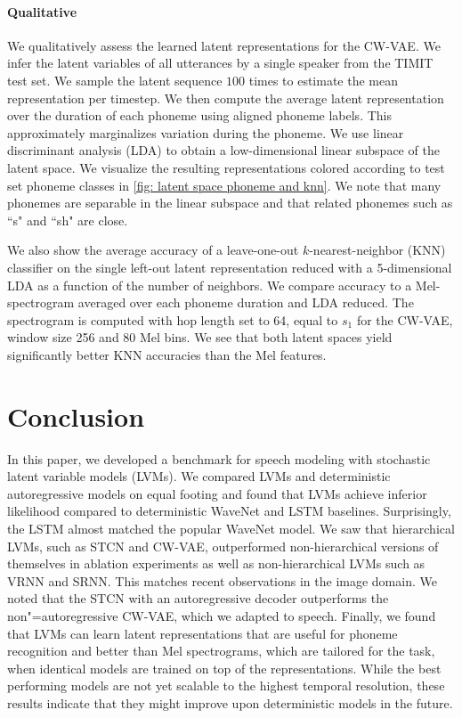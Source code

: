 {\paragraph{Qualitative}
We qualitatively assess the learned latent representations for the CW-VAE. 
We infer the latent variables of all utterances by a single speaker from the TIMIT test set. We sample the latent sequence $100$ times to estimate the mean representation per timestep. We then compute the average latent representation over the duration of each phoneme using aligned phoneme labels. This approximately marginalizes variation during the phoneme. We use linear discriminant analysis (LDA) \parencite{fisher_use_1936} to obtain a low-dimensional linear subspace of the latent space. 
We visualize the resulting representations colored according to test set phoneme classes in \cref{fig: latent space phoneme and knn}. We note that many phonemes are separable in the linear subspace and that related phonemes such as ``s" and ``sh" are close.

We also show the average accuracy of a leave-one-out $k$-nearest-neighbor (KNN) classifier on the single left-out latent representation reduced with a 5-dimensional LDA as a function of the number of neighbors. 
We compare accuracy to a Mel-spectrogram averaged over each phoneme duration and LDA reduced. The spectrogram is computed with hop length set to 64, equal to $s_1$ for the CW-VAE, window size 256 and 80 Mel bins.
We see that both latent spaces yield significantly better KNN accuracies than the Mel features.


\section{Conclusion}
In this paper, we developed a benchmark for speech modeling with stochastic latent variable models (LVMs). 
We compared LVMs and deterministic autoregressive models on equal footing and found that LVMs achieve inferior likelihood compared to deterministic WaveNet and LSTM baselines. Surprisingly, the LSTM almost matched the popular WaveNet model. 
We saw that hierarchical LVMs, such as STCN and CW-VAE, outperformed non-hierarchical versions of themselves in ablation experiments as well as non-hierarchical LVMs such as VRNN and SRNN. This matches recent observations in the image domain. 
We noted that the STCN with an autoregressive decoder outperforms the non"=autoregressive CW-VAE, which we adapted to speech. 
Finally, we found that LVMs can learn latent representations that are useful for phoneme recognition and better than Mel spectrograms, which are tailored for the task, when identical models are trained on top of the representations.
While the best performing models are not yet scalable to the highest temporal resolution, these results indicate that they might improve upon deterministic models in the future. 


}
